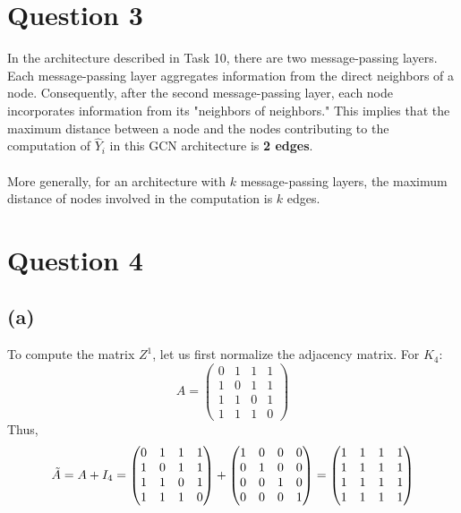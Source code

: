 \documentclass[a4paper]{article}
\begin{document}
\section*{Question 3}

In the architecture described in Task 10, there are two message-passing
layers. Each message-passing layer aggregates information from the direct
neighbors of a node. Consequently, after the second message-passing
layer, each node incorporates information from its "neighbors of neighbors."
This implies that the maximum distance between a node and the nodes
contributing to the computation of $\hat{Y}_i$ in this GCN architecture is
\textbf{2 edges}.
\\
\\
More generally, for an architecture with $k$ message-passing layers,
the maximum distance of nodes involved in the computation is $k$ edges.


\section*{Question 4}
\subsection*{(a)}
To compute the matrix $Z^1$,
let us first normalize the adjacency matrix.
For $K_4$:
\[
A = \begin{pmatrix}
0 & 1 & 1 & 1 \\
1 & 0 & 1 & 1 \\
1 & 1 & 0 & 1 \\
1 & 1 & 1 & 0
\end{pmatrix}
\]
Thus,
\[
\Tilde{A} = A + I_4= \begin{pmatrix}
0 & 1 & 1 & 1 \\
1 & 0 & 1 & 1 \\
1 & 1 & 0 & 1 \\
1 & 1 & 1 & 0
\end{pmatrix} + \begin{pmatrix}
1 & 0 & 0 & 0 \\
0 & 1 & 0 & 0 \\
0 & 0 & 1 & 0 \\
0 & 0 & 0 & 1
\end{pmatrix} = \begin{pmatrix}
1 & 1 & 1 & 1 \\
1 & 1 & 1 & 1 \\
1 & 1 & 1 & 1 \\
1 & 1 & 1 & 1
\end{pmatrix}
\]
\end{document}

